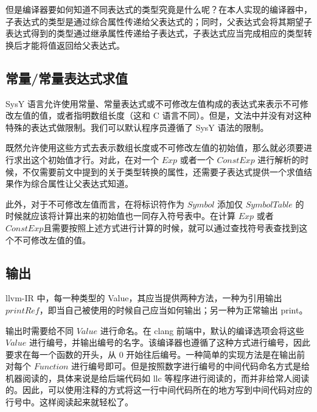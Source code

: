 \documentclass[a4paper]{article}
\begin{document}
			但是编译器要如何知道不同表达式的类型究竟是什么呢？在本人实现的编译器中，子表达式的类型是通过综合属性传递给父表达式的；同时，父表达式会将其期望子表达式得到的类型通过继承属性传递给子表达式，子表达式应当完成相应的类型转换后才能将值返回给父表达式。
			
		\subsection{常量/常量表达式求值}
		
			SysY 语言允许使用常量、常量表达式或不可修改左值构成的表达式来表示不可修改左值的值，或者指明数组长度（这和 C 语言不同）。但是，文法中并没有对这种特殊的表达式做限制。我们可以默认程序员遵循了 SysY 语法的限制。
			
			既然允许使用这些方式去表示数组长度或不可修改左值的初始值，那么就必须要进行求出这个初始值才行。对此，在对一个 $Exp$ 或者一个 $ConstExp$ 进行解析的时候，不仅需要前文中提到的关于类型转换的属性，还需要子表达式提供一个求值结果作为综合属性让父表达式知道。
			
			此外，对于不可修改左值而言，在将标识符作为 $Symbol$ 添加仅 $SymbolTable$ 的时候就应该将计算出来的初始值也一同存入符号表中。在计算 $Exp$ 或者 $ConstExp $且需要按照上述方式进行计算的时候，就可以通过查找符号表查找到这个不可修改左值的值。
			
		\subsection{输出}
		
			llvm-IR 中，每一种类型的 Value，其应当提供两种方法，一种为引用输出 $printRef$，即当自己被使用的时候自己应当如何输出；另一种为正常输出 print。
			
			输出时需要给不同 $Value$ 进行命名。在 clang 前端中，默认的编译选项会将这些 $Value$ 进行编号，并输出编号的名字。该编译器也遵循了这种方式进行编号，因此要求在每一个函数的开头，从 0 开始往后编号。一种简单的实现方法是在输出前对每个 $Function$ 进行编号即可。但是按照数字进行编号的中间代码命名方式是给机器阅读的，具体来说是给后端代码如 llc 等程序进行阅读的，而并非给常人阅读的。因此，可以使用注释的方式将这一行中间代码所在的地方写到中间代码对应的行号中。这样阅读起来就轻松了。
	
\end{document}
